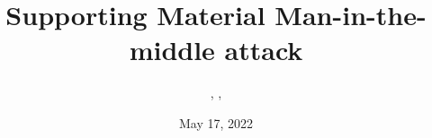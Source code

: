 \documentclass{../../../extra/styles/SecureRole}
\title{Supporting Material Man-in-the-middle attack}
\author{\Ba, \Wi, \Zm}
\date{May 17, 2022}
\begin{document}
\makecover
\newpage

\tableofcontents
\newpage


\end{document}
